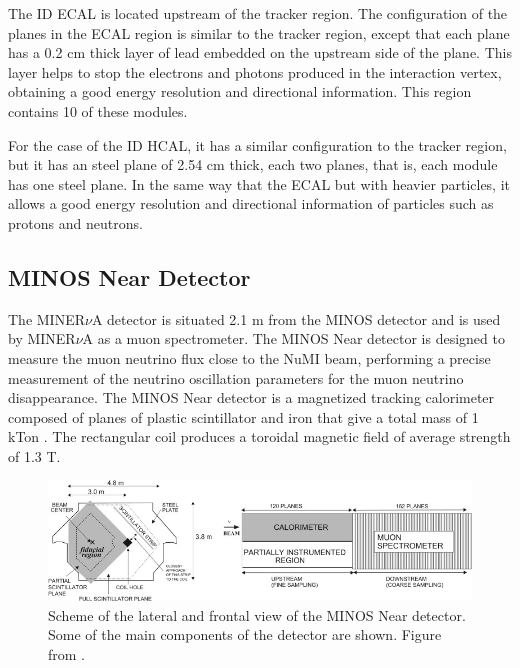\begin{itemize}
    The ID ECAL is located upstream of the tracker region. The configuration of the planes in the ECAL region is similar to the tracker region, except that each plane has a 0.2 cm thick layer of lead embedded on the upstream side of the plane. This layer helps to stop the electrons and photons produced in the interaction vertex, obtaining a good energy resolution and directional information. This region contains 10 of these modules. 

    For the case of the ID HCAL, it has a similar configuration to the tracker region, but it has an steel plane of 2.54 cm thick, each two planes, that is, each module has one steel plane. In the same way that the ECAL but with heavier particles, it allows a good energy resolution and directional information of particles such as protons and neutrons. 
    
\end{itemize}

\subsection{MINOS Near Detector}
\label{Cap:MnvExp:MnvDetector:MINOS}

The MINER$\nu$A detector is situated 2.1 m from the MINOS detector and is used by MINER$\nu$A as a muon spectrometer. The MINOS Near detector is designed to measure the muon neutrino flux close to the NuMI beam, performing a precise measurement of the neutrino oscillation parameters for the muon neutrino disappearance. The MINOS Near detector is a magnetized tracking calorimeter composed of planes of plastic scintillator and iron that give a total mass of 1 kTon \cite{MINOSpaper}. The rectangular coil produces a toroidal magnetic field of average strength of 1.3 T.

\begin{figure}
    \centering
    \includegraphics[scale=0.9]{Figures/Chapter2/MINOSNDScheme.jpg}
    \caption{Scheme of the lateral and frontal view of the MINOS Near detector. Some of the main components of the detector are shown. Figure from \cite{MINERvA}.}
    \label{fig:MnvExp:MnvDetector:SchemeMINOSND}
\end{figure}

